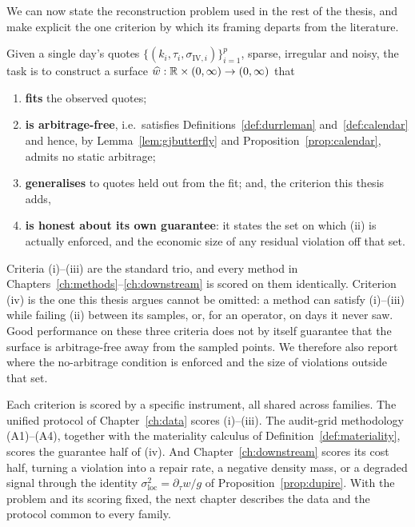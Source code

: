 We can now state the reconstruction problem used in the rest of the thesis, and make explicit the
one criterion by which its framing departs from the literature.

Given a single day's quotes $\{(k_i,\tau_i,\sigma_{\mathrm{IV},i})\}_{i=1}^{p}$, sparse,
irregular and noisy, the task is to construct a surface
$\widehat w:\mathbb{R}\times(0,\infty)\to(0,\infty)$ that

\begin{enumerate}[label=(\roman*)]
\item \textbf{fits} the observed quotes;
\item \textbf{is arbitrage-free}, i.e.\ satisfies Definitions~\ref{def:durrleman}
and~\ref{def:calendar} and hence, by Lemma~\ref{lem:gjbutterfly} and
Proposition~\ref{prop:calendar}, admits no static arbitrage;
\item \textbf{generalises} to quotes held out from the fit; and, the criterion this thesis adds,
\item \textbf{is honest about its own guarantee}: it states the set on which (ii) is actually
enforced, and the economic size of any residual violation off that set.
\end{enumerate}

Criteria (i)--(iii) are the standard trio, and every method in
Chapters~\ref{ch:methods}--\ref{ch:downstream} is scored on them identically. Criterion (iv) is
the one this thesis argues cannot be omitted: a method can satisfy (i)--(iii) while failing (ii)
between its samples, or, for an operator, on days it never saw. Good performance on these three
criteria does not by itself guarantee that the surface is arbitrage-free away from the sampled
points. We therefore also report where the no-arbitrage condition is enforced and the size of
violations outside that set.

Each criterion is scored by a specific instrument, all shared across families. The unified
protocol of Chapter~\ref{ch:data} scores (i)--(iii). The audit-grid methodology (A1)--(A4),
together with the materiality calculus of Definition~\ref{def:materiality}, scores the guarantee
half of (iv). And Chapter~\ref{ch:downstream} scores its cost half, turning a violation into a
repair rate, a negative density mass, or a degraded signal through the identity
$\sigma_{\mathrm{loc}}^2=\partial_\tau w/g$ of Proposition~\ref{prop:dupire}. With the problem
and its scoring fixed, the next chapter describes the data and the protocol common to every
family.
